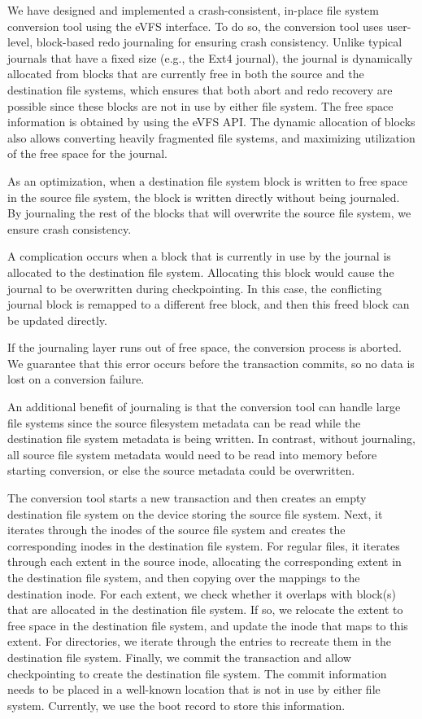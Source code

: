 We have designed and implemented a crash-consistent, in-place file system conversion tool using the eVFS interface. To do so, the conversion tool uses user-level, block-based redo journaling for ensuring crash consistency. Unlike typical journals that have a fixed size (e.g., the Ext4 journal), the journal is dynamically allocated from blocks that are currently free in both the source and the destination file systems, which ensures that both abort and redo recovery are possible since these blocks are not in use by either file system. The free space information is obtained by using the eVFS API. The dynamic allocation of blocks also allows converting heavily fragmented file systems, and maximizing utilization of the free space for the journal.

As an optimization, when a destination file system block is written to free space in the source file system, the block is written directly without being journaled. By journaling the rest of the blocks that will overwrite the source file system, we ensure crash consistency.

A complication occurs when a block that is currently in use by the journal is allocated to the destination file system. Allocating this block would cause the journal to be overwritten during checkpointing. In this case, the conflicting journal block is remapped to a different free block, and then this freed block can be updated directly.

If the journaling layer runs out of free space, the conversion process is aborted. We guarantee that this error occurs before the transaction commits, so no data is lost on a conversion failure.

An additional benefit of journaling is that the conversion tool can handle large file systems since the source filesystem metadata can be read while the destination file system metadata is being written. In contrast, without journaling, all source file system metadata would need to be read into memory before starting conversion, or else the source metadata could be overwritten.

The conversion tool starts a new transaction and then creates an empty destination file system on the device storing the source file system. Next, it iterates through the inodes of the source file system and creates the corresponding inodes in the destination file system. For regular files, it iterates through each extent in the source inode, allocating the corresponding extent in the destination file system, and then copying over the mappings to the destination inode. For each extent, we check whether it overlaps with block(s) that are allocated in the destination file system. If so, we relocate the extent to free space in the destination file system, and update the inode that maps to this extent. For directories, we iterate through the entries to recreate them in the destination file system. Finally, we commit the transaction and allow checkpointing to create the destination file system. The commit information needs to be placed in a well-known location that is not in use by either file system. Currently, we use the boot record to store this information.


